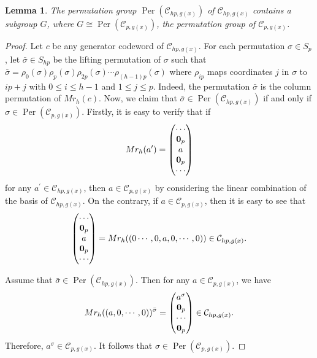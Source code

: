 \documentclass[journal,12pt,onecolumn]{IEEEtran}
\newtheorem{lemma}{Lemma}
\begin{document}
\begin{lemma}\label{L_hp_col}
    The permutation group $\operatorname{Per}(\mathcal{C}_{hp,g(x)})$ of $\mathcal{C}_{hp,g(x)}$ contains a subgroup $G$, where $G\cong \operatorname{Per}(\mathcal{C}_{p,g(x)})$, the permutation group of $\mathcal{C}_{p,g(x)}$. 
\end{lemma}
\begin{proof}
    Let $c$ be any generator codeword of $\mathcal{C}_{hp,g(x)}$. For each permutation $\sigma\in S_p$, let $\bar{\sigma}\in S_{hp}$ be the lifting permutation of $\sigma$ such that $\bar{\sigma} = \rho_0(\sigma)\rho_p(\sigma)\rho_{2p}(\sigma)\cdots\rho_{(h-1)p}(\sigma)$ where $\rho_{ip}$ maps coordinates $j$ in $\sigma$ to $ip+j$ with $0\le i \le h-1$ and $1\le j \le p$. Indeed, the permutation $\bar{\sigma}$ is the column permutation of $Mr_{h}(c)$. Now, we claim that $\bar{\sigma}\in \operatorname{Per}(\mathcal{C}_{hp,g(x)})$ if and only if $\sigma\in \operatorname{Per}(\mathcal{C}_{p,g(x)})$. Firstly, it is easy to verify that if
    \[
        Mr_{h}(a^\prime) = \begin{pmatrix}
            \cdots \\
            {\bf 0}_p \\
            a \\
            {\bf 0}_p \\
            \cdots
        \end{pmatrix}
    \]
    for any $a^\prime\in\mathcal{C}_{hp,g(x)}$, then $a\in \mathcal{C}_{p,g(x)}$ by considering the linear combination of the basis of $\mathcal{C}_{hp,g(x)}$. On the contrary, if $a\in \mathcal{C}_{p,g(x)}$, then it is easy to see that
    \[
        \begin{pmatrix}
            \cdots \\
            {\bf 0}_p \\
            a \\
            {\bf 0}_p \\
            \cdots
        \end{pmatrix} = Mr_{h}((0\cdots,0,a,0,\cdots,0))\in\mathcal{C}_{hp,g(x)}.
    \]

    Assume that $\bar{\sigma}\in \operatorname{Per}(\mathcal{C}_{hp,g(x)})$. Then for any $a\in \mathcal{C}_{p,g(x)}$, we have
    \[
        Mr_{h}((a,0,\cdots,0))^{\bar{\sigma}} = \begin{pmatrix}
            a^\sigma \\
            {\bf 0}_p \\
            \cdots \\
            {\bf 0}_p
        \end{pmatrix}\in\mathcal{C}_{hp,g(x)}.
    \]
    Therefore, $a^\sigma\in\mathcal{C}_{p,g(x)}$. It follows that $\sigma\in \operatorname{Per}(\mathcal{C}_{p,g(x)})$. 


\end{proof}
\end{document}
